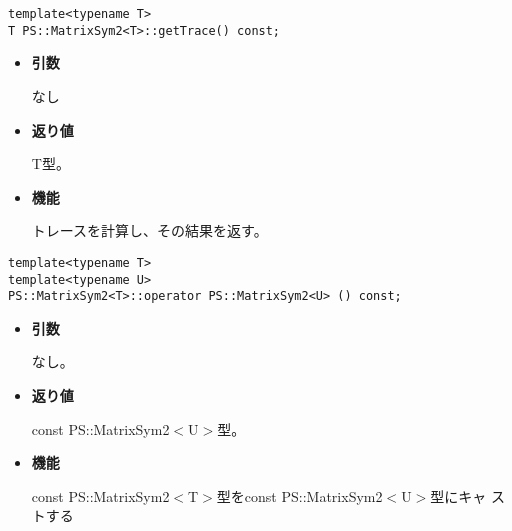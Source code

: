 
\begin{screen}
\begin{verbatim}
template<typename T>
T PS::MatrixSym2<T>::getTrace() const;
\end{verbatim}
\end{screen}

\begin{itemize}

\item{{\bf 引数}}

なし

\item{{\bf 返り値}}

{T}型。

\item{{\bf 機能}}

  トレースを計算し、その結果を返す。

\end{itemize}


\begin{screen}
\begin{verbatim}
template<typename T>
template<typename U>
PS::MatrixSym2<T>::operator PS::MatrixSym2<U> () const;
\end{verbatim}
\end{screen}

\begin{itemize}

\item{{\bf 引数}}

  なし。

\item{{\bf 返り値}}

{const PS::MatrixSym2$<$U$>$}型。

\item{{\bf 機能}}

  {const PS::MatrixSym2$<$T$>$}型を{const PS::MatrixSym2$<$U$>$}型にキャ
  ストする

\end{itemize}

